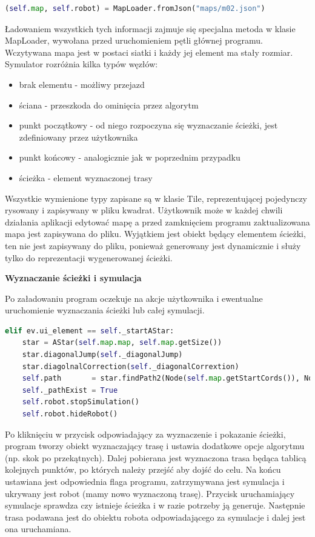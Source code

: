 \begin{lstlisting}[language=Python,caption=Uruchomienie aplikacji,label={kodPythonWczytanieMapy}]
(self.map, self.robot) = MapLoader.fromJson("maps/m02.json")
\end{lstlisting}
Ładowaniem wszystkich tych informacji zajmuje się specjalna metoda w klasie MapLoader, wywołana przed uruchomieniem pętli głównej programu.
Wczytywana mapa jest w postaci siatki i każdy jej element ma stały rozmiar. Symulator rozróżnia kilka typów węzłów:
\begin{itemize}
	\item brak elementu - możliwy przejazd 
	\item ściana - przeszkoda do ominięcia przez algorytm
	\item punkt początkowy - od niego rozpoczyna się wyznaczanie ścieżki, jest zdefiniowany przez użytkownika
	\item punkt końcowy - analogicznie jak w poprzednim przypadku
	\item ścieżka - element wyznaczonej trasy
\end{itemize}

Wszystkie wymienione typy zapisane są w klasie Tile, reprezentującej pojedynczy rysowany i zapisywany w pliku kwadrat.
Użytkownik może w każdej chwili działania aplikacji edytować mapę a  przed zamknięciem programu 
zaktualizowana mapa jest zapisywana do pliku. Wyjątkiem jest obiekt będący elementem ścieżki, 
ten nie jest zapisywany do pliku, ponieważ generowany jest dynamicznie i służy tylko do reprezentacji wygenerowanej ścieżki.

\textbf{Wyznaczanie ścieżki i symulacja}


Po załadowaniu program oczekuje na akcje użytkownika i ewentualne uruchomienie wyznaczania ścieżki lub całej symulacji.
\begin{lstlisting}[language=Python,caption=Uruchomienie aplikacji,label={kodPythonWyznaczenieSciezki}]
elif ev.ui_element == self._startAStar:
    star = AStar(self.map.map, self.map.getSize())
    star.diagonalJump(self._diagonalJump)
    star.diagolnalCorrection(self._diagonalCorrextion)
    self.path       = star.findPath2(Node(self.map.getStartCords()), Node((self.map.getEndCords())))
    self._pathExist = True
    self.robot.stopSimulation()
    self.robot.hideRobot()
\end{lstlisting}

Po kliknięciu w przycisk odpowiadający za wyznaczenie i pokazanie ścieżki, program tworzy obiekt 
wyznaczający trasę i ustawia dodatkowe opcje algorytmu (np. skok po przekątnych). 
Dalej pobierana jest wyznaczona trasa będąca tablicą kolejnych punktów, po których należy przejść aby dojść do celu.
Na końcu ustawiana jest odpowiednia flaga programu, zatrzymywana jest symulacja i ukrywany jest robot (mamy nowo wyznaczoną trasę).
Przycisk uruchamiający symulacje sprawdza czy istnieje ścieżka i w razie potrzeby ją generuje. Następnie trasa podawana 
jest do obiektu robota odpowiadającego za symulacje i dalej jest ona uruchamiana.

